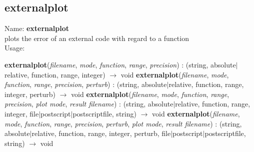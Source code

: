\subsection{externalplot}
\label{labexternalplot}
\noindent Name: \textbf{externalplot}\\
plots the error of an external code with regard to a function\\
\noindent Usage: 
\begin{center}
\textbf{externalplot}(\emph{filename}, \emph{mode}, \emph{function}, \emph{range}, \emph{precision}) : (\textsf{string}, \textsf{absolute$|$relative}, \textsf{function}, \textsf{range}, \textsf{integer}) $\rightarrow$ \textsf{void}
\textbf{externalplot}(\emph{filename}, \emph{mode}, \emph{function}, \emph{range}, \emph{precision}, \emph{perturb}) : (\textsf{string}, \textsf{absolute$|$relative}, \textsf{function}, \textsf{range}, \textsf{integer}, \textsf{perturb}) $\rightarrow$ \textsf{void}
\textbf{externalplot}(\emph{filename}, \emph{mode}, \emph{function}, \emph{range}, \emph{precision}, \emph{plot mode}, \emph{result filename}) : (\textsf{string}, \textsf{absolute$|$relative}, \textsf{function}, \textsf{range}, \textsf{integer}, \textsf{file$|$postscript$|$postscriptfile}, \textsf{string}) $\rightarrow$ \textsf{void}
\textbf{externalplot}(\emph{filename}, \emph{mode}, \emph{function}, \emph{range}, \emph{precision}, \emph{perturb}, \emph{plot mode}, \emph{result filename}) : (\textsf{string}, \textsf{absolute$|$relative}, \textsf{function}, \textsf{range}, \textsf{integer}, \textsf{perturb}, \textsf{file$|$postscript$|$postscriptfile}, \textsf{string}) $\rightarrow$ \textsf{void}
\end{center}
